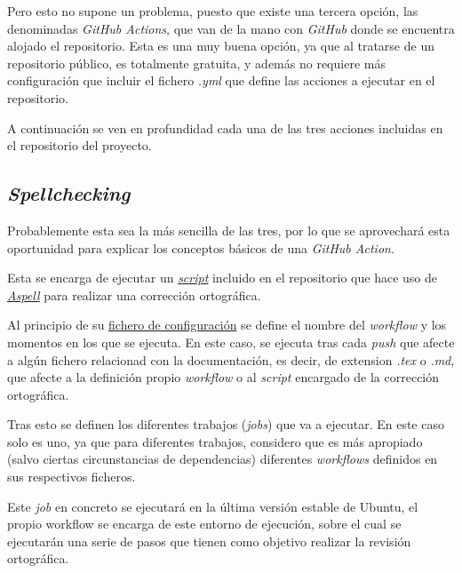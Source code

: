 Pero esto no supone un problema, puesto que existe una tercera opción, las denominadas \textit{GitHub Actions}, que van de la mano con \textit{GitHub} donde se encuentra alojado el repositorio. Esta es una muy buena opción, ya que al tratarse de un repositorio público, es totalmente gratuita, y además no requiere más configuración que incluir el fichero \textit{.yml} que define las acciones a ejecutar en el repositorio.

A continuación se ven en profundidad cada una de las tres acciones incluidas en el repositorio del proyecto.

\subsection{\textit{Spellchecking}}

Probablemente esta sea la más sencilla de las tres, por lo que se aprovechará esta oportunidad para explicar los conceptos básicos de una \textit{GitHub Action}.

Esta se encarga de ejecutar un \href{https://github.com/Anglepi/My-Many-Reads/blob/main/scripts/spellcheck.sh}{\textit{script}} incluido en el repositorio que hace uso de \hyperref[aspell]{\underline{\textit{Aspell}}} para realizar una corrección ortográfica.

Al principio de su \href{https://github.com/Anglepi/My-Many-Reads/blob/main/.github/workflows/spellcheck.yml}{fichero de configuración} se define el nombre del \textit{workflow} y los momentos en los que se ejecuta. En este caso, se ejecuta tras cada \textit{push} que afecte a algún fichero relacionad con la documentación, es decir, de extension \textit{.tex} o \textit{.md}, que afecte a la definición propio \textit{workflow} o al \textit{script} encargado de la corrección ortográfica.

Tras esto se definen los diferentes trabajos (\textit{jobs}) que va a ejecutar. En este caso solo es uno, ya que para diferentes trabajos, considero que es más apropiado (salvo ciertas circunstancias de dependencias) diferentes \textit{workflows} definidos en sus respectivos ficheros.

Este \textit{job} en concreto se ejecutará en la última versión estable de Ubuntu, el propio workflow se encarga de este entorno de ejecución, sobre el cual se ejecutarán una serie de pasos que tienen como objetivo realizar la revisión ortográfica.

